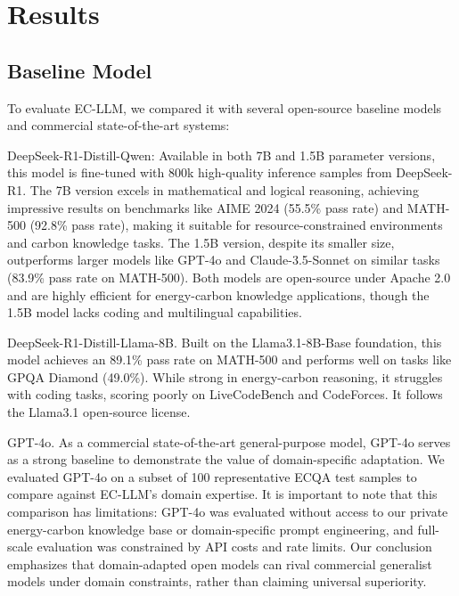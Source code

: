 \documentclass[]{interact}
\theoremstyle{plain}%
\theoremstyle{definition}
\theoremstyle{remark}
\begin{document}
\section{Results}\label{sec4}

\subsection{Baseline Model}
To evaluate EC-LLM, we compared it with several open-source baseline models and commercial state-of-the-art systems:

DeepSeek-R1-Distill-Qwen: Available in both 7B and 1.5B parameter versions, this model is fine-tuned with 800k high-quality inference samples from DeepSeek-R1. The 7B version excels in mathematical and logical reasoning, achieving impressive results on benchmarks like AIME 2024 (55.5\% pass rate) and MATH-500 (92.8\% pass rate), making it suitable for resource-constrained environments and carbon knowledge tasks. The 1.5B version, despite its smaller size, outperforms larger models like GPT-4o and Claude-3.5-Sonnet on similar tasks (83.9\% pass rate on MATH-500). Both models are open-source under Apache 2.0 and are highly efficient for energy-carbon knowledge applications, though the 1.5B model lacks coding and multilingual capabilities.

DeepSeek-R1-Distill-Llama-8B. Built on the Llama3.1-8B-Base foundation, this model achieves an 89.1\% pass rate on MATH-500 and performs well on tasks like GPQA Diamond (49.0\%). While strong in energy-carbon reasoning, it struggles with coding tasks, scoring poorly on LiveCodeBench and CodeForces. It follows the Llama3.1 open-source license.

GPT-4o. As a commercial state-of-the-art general-purpose model, GPT-4o serves as a strong baseline to demonstrate the value of domain-specific adaptation. We evaluated GPT-4o on a subset of 100 representative ECQA test samples to compare against EC-LLM's domain expertise. It is important to note that this comparison has limitations: GPT-4o was evaluated without access to our private energy-carbon knowledge base or domain-specific prompt engineering, and full-scale evaluation was constrained by API costs and rate limits. Our conclusion emphasizes that domain-adapted open models can rival commercial generalist models under domain constraints, rather than claiming universal superiority.
\end{document}
